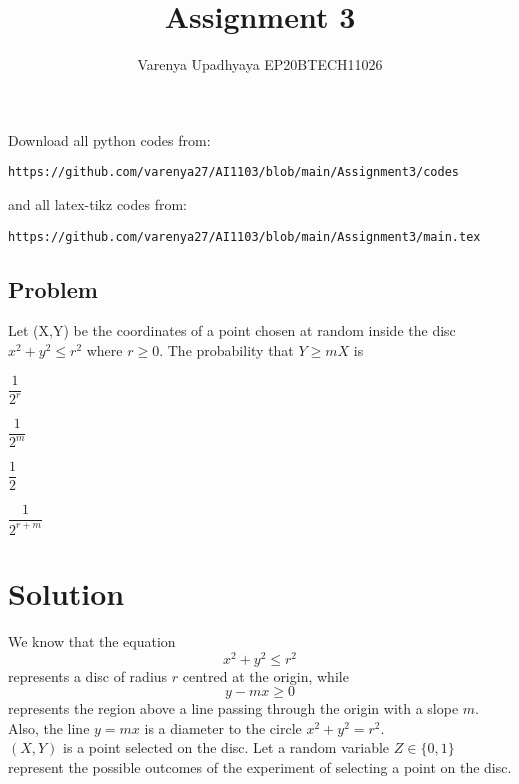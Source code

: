 \documentclass[journal,12pt,twocolumn]{IEEEtran}
\title{Assignment 3}
\author{Varenya Upadhyaya EP20BTECH11026}
\date{}
\begin{document}
\maketitle
Download all python codes from:
\begin{lstlisting}
https://github.com/varenya27/AI1103/blob/main/Assignment3/codes
\end{lstlisting}
and all latex-tikz codes from:
\begin{lstlisting}
https://github.com/varenya27/AI1103/blob/main/Assignment3/main.tex
\end{lstlisting}
\maketitle   
\begin{center}
\section*{\textbf{Problem}}
\end{center}
Let (X,Y) be the coordinates of a point chosen at random inside the disc $x^2 + y^2 \leq r^2$ where $r\geq 0$. The probability that $Y \geq mX$ is
\begin{enumerate}[label = (\alph*)]
\begin{multicols}{2}
\setlength\itemsep{2em}
    \item $\dfrac{1}{2^r}$
    \item $\dfrac{1}{2^m}$
    \item $\dfrac{1}{2}$
    \item $\dfrac{1}{2^{r+m}}$
\end{multicols}
\end{enumerate}

\maketitle
\section*{\textbf{Solution}}
We know that the equation 
\begin{equation} 
x^2 + y^2 \leq r^2 
\end{equation}
represents a disc of radius $r$ centred at the origin, while 
\begin{equation}
y - mx \geq 0
\end{equation} represents the region above a line passing through the origin with a slope $m$. Also, the line $y=mx$ is a diameter to the circle $x^2 + y^2 = r^2$.\\
$(X,Y)$ is a point selected on the disc. Let a random variable $Z \in \{0,1\}$ represent the possible outcomes of the experiment of selecting a point on the disc.
\end{document}
